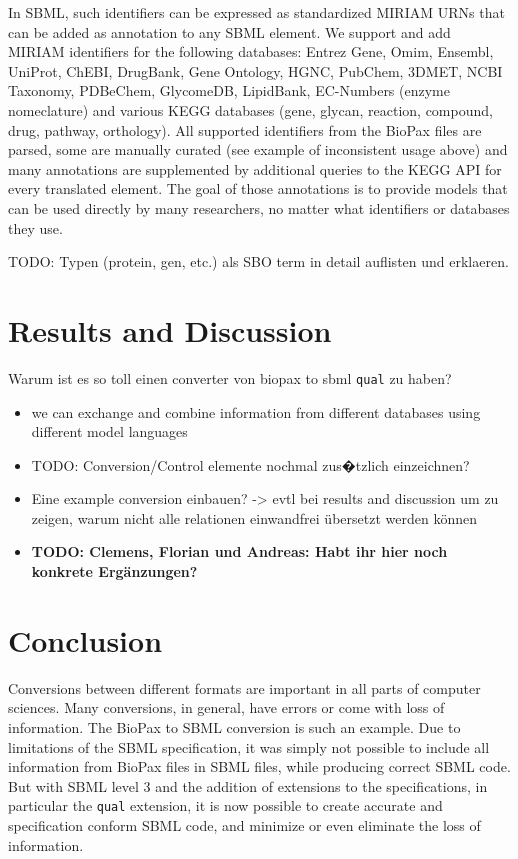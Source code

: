 \documentclass{bioinfo}
\newcommand{\qual}{\texttt{qual}}
\begin{document}
\begin{methods}
In SBML, such identifiers can be expressed as standardized MIRIAM URNs that can be added as annotation to any SBML element.
We support and add MIRIAM identifiers for the following databases: Entrez Gene, Omim, Ensembl, UniProt, ChEBI, DrugBank, Gene Ontology, HGNC, PubChem, 3DMET, NCBI Taxonomy, PDBeChem, GlycomeDB, LipidBank, EC-Numbers (enzyme nomeclature) and various KEGG databases (gene, glycan, reaction, compound, drug, pathway, orthology).
All supported identifiers from the BioPax files are parsed, some are manually curated (see example of inconsistent usage above) and many annotations are supplemented by additional queries to the KEGG API for every translated element.
The goal of those annotations is to provide models that can be used directly by many researchers, no matter what identifiers or databases they use.

TODO: Typen (protein, gen, etc.) als SBO term in detail auflisten und erklaeren.

\end{methods}


\section{Results and Discussion}
Warum ist es so toll einen converter von biopax to sbml \qual{} zu haben?
\begin{itemize}
\item we can exchange and combine information from different databases using different model languages
\item TODO: Conversion/Control elemente nochmal zus�tzlich einzeichnen?
\item Eine example conversion einbauen? -> evtl bei results and discussion um zu zeigen, warum nicht alle relationen einwandfrei \"ubersetzt werden k\"onnen
    \item \textbf{TODO: Clemens, Florian und Andreas: Habt ihr hier noch konkrete Erg\"anzungen?}
\end{itemize}

\section{Conclusion}
Conversions between different formats are important in all parts of computer sciences. Many conversions, in general, have errors or come with loss of information. The BioPax to SBML conversion is such an example. Due to limitations of the SBML specification, it was simply not possible to include all information from BioPax files in SBML files, while producing correct SBML code. But with SBML level 3 and the addition of extensions to the specifications, in particular the \qual{} extension, it is now possible to create accurate and specification conform SBML code, and minimize or even eliminate the loss of information.
\end{document}
